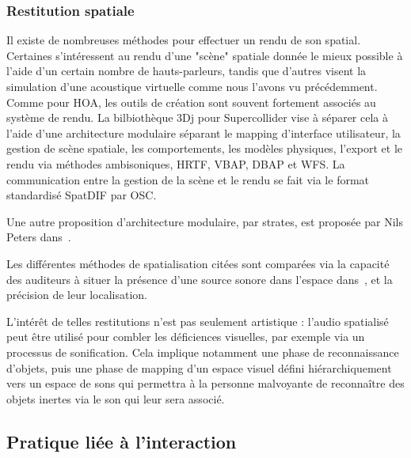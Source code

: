 \documentclass[french,12pt]{article}
\begin{document}
\subsubsection{Restitution spatiale}
Il existe de nombreuses méthodes pour effectuer un rendu de son spatial. Certaines s'intéressent au rendu d'une "scène" spatiale donnée le mieux possible à l'aide d'un certain nombre de hauts-parleurs, tandis que d'autres visent la simulation d'une acoustique virtuelle comme nous l'avons vu précédemment. Comme pour HOA, les outils de création sont souvent fortement associés au système de rendu. La bilbiothèque 3Dj\cite{perez-lopez_3dj_2015} pour Supercollider vise à séparer cela à l'aide d'une architecture modulaire séparant le mapping d'interface utilisateur, la gestion de scène spatiale, les comportements, les modèles physiques, l'export et le rendu via méthodes ambisoniques, HRTF\cite{noisternig_3d_2003}, \ac{VBAP}, \ac{DBAP} et \ac{WFS}.
La communication entre la gestion de la scène et le rendu se fait via le format standardisé SpatDIF\cite{peters_spatial_2013} par OSC. %

Une autre proposition d'architecture modulaire, par strates, est proposée par Nils Peters dans~\cite{peters_stratified_2009}.

Les différentes méthodes de spatialisation citées sont comparées via la capacité des auditeurs à situer la présence d'une source sonore dans l'espace dans~\cite{bates_comparative_2007}, et la précision de leur localisation.

L'intérêt de telles restitutions n'est pas seulement artistique : l'audio spatialisé peut être utilisé pour combler les déficiences visuelles, par exemple via un processus de sonification\cite{tang_assistive_2014}. Cela implique notamment une phase de reconnaissance d'objets, puis une phase de mapping d'un espace visuel défini hiérarchiquement vers un espace de sons qui permettra à la personne malvoyante de reconnaître des objets inertes via le son qui leur sera associé.

\subsection{Pratique liée à l'interaction}

\end{document}
